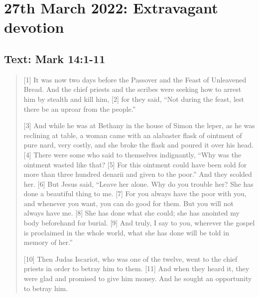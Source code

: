 \section{27th March 2022: Extravagant devotion}
\subsection*{Text: Mark 14:1-11}
  \begin{quote}
    [1] It was now two days before the Passover and the Feast of Unleavened
    Bread.  And the chief priests and the scribes were seeking how to arrest
    him by stealth and kill him, [2] for they said, “Not during the feast,
    lest there be an uproar from the people.”

    [3] And while he was at Bethany in the house of Simon the leper, as he
    was reclining at table, a woman came with an alabaster flask of ointment
    of pure nard, very costly, and she broke the flask and poured it over his
    head.  [4] There were some who said to themselves indignantly, “Why was
    the ointment wasted like that?  [5] For this ointment could have been
    sold for more than three hundred denarii and given to the poor.” And they
    scolded her.  [6] But Jesus said, “Leave her alone.  Why do you trouble
    her?  She has done a beautiful thing to me.  [7] For you always have the
    poor with you, and whenever you want, you can do good for them.  But you
    will not always have me.  [8] She has done what she could; she has
    anointed my body beforehand for burial.  [9] And truly, I say to you,
    wherever the gospel is proclaimed in the whole world, what she has done
    will be told in memory of her.”

    [10] Then Judas Iscariot, who was one of the twelve, went to the chief
    priests in order to betray him to them.  [11] And when they heard it,
    they were glad and promised to give him money.  And he sought an
    opportunity to betray him.
  \end{quote}
